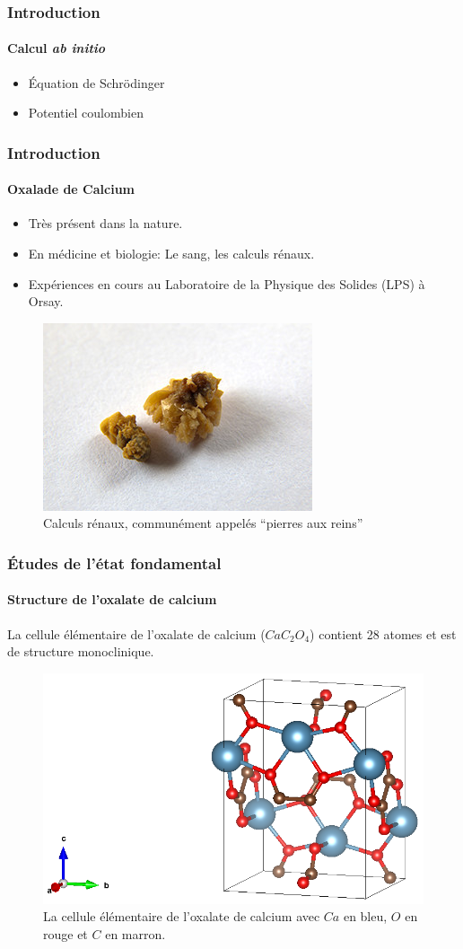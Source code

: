 \documentclass[french]{beamer}
\begin{document}
\begin{frame}
\frametitle{Introduction}
\framesubtitle{Calcul \textit{ab initio}}
\begin{itemize}
  \item Équation de Schrödinger
  \item Potentiel coulombien
\end{itemize}
\end{frame}
\newpage

\begin{frame}
\frametitle{Introduction}
\framesubtitle{Oxalade de Calcium}
\begin{itemize}
  \item Très présent dans la nature.
  \item En médicine et biologie: Le sang, les calculs rénaux.
  \item Expériences en cours au Laboratoire de la Physique des Solides (LPS) à Orsay.
\end{itemize}
\begin{figure}[!h]
  \centering
  \includegraphics[height=0.4\textheight]{calcium-oxalate-kidney-stone}
  \caption{Calculs rénaux, communément appelés ``pierres aux reins''}
\end{figure}
\end{frame}
\newpage

\begin{frame}
\frametitle{Études de l'état fondamental}
\framesubtitle{Structure de l'oxalate de calcium}
La cellule élémentaire de l'oxalate de calcium ($CaC_2O_4$) contient 28 atomes et est de structure monoclinique.
\begin{figure}[!h]
  \centering
  \includegraphics[height=0.4\textheight]{co_structure}
  \caption{La cellule élémentaire de l'oxalate de calcium avec $Ca$ en bleu, $O$ en rouge et $C$ en marron.}\label{BrillouinZone}
\end{figure}
\end{frame}
\newpage
\end{document}

